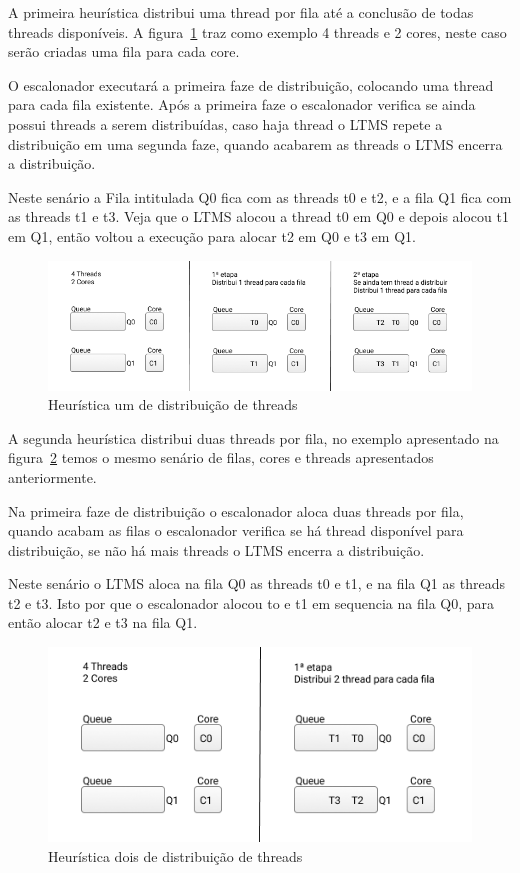 \documentclass[diss,capa]{texufpel}
\begin{document}
A primeira heurística distribui uma thread por fila até a conclusão de todas threads disponíveis. A figura~\ref{queue_one} traz como exemplo 4 threads e 2 cores, neste caso serão criadas uma fila para cada core.

O escalonador executará a primeira faze de distribuição, colocando uma thread para cada fila existente. Após a primeira faze o escalonador verifica se ainda possui threads a serem distribuídas, caso haja thread o LTMS repete a distribuição em uma segunda faze, quando acabarem as threads o LTMS encerra a distribuição.

Neste senário a Fila intitulada Q0 fica com as threads t0 e t2, e a fila Q1 fica com as threads t1 e t3. Veja que o LTMS alocou a thread t0 em Q0 e depois alocou t1 em Q1, então voltou a execução para alocar t2 em Q0 e t3 em Q1.

\begin{figure}[htbp]
  \centering
  \includegraphics[scale=.6]{images/Queue_one.png}
\caption{Heurística um de distribuição de threads}
\label{queue_one}
\end{figure}

A segunda heurística distribui duas threads por fila, no exemplo apresentado na figura~\ref{queue_two} temos o mesmo senário de filas, cores e threads apresentados anteriormente.

Na primeira faze de distribuição o escalonador aloca duas threads por fila, quando acabam as filas o escalonador verifica se há thread disponível para distribuição, se não há mais threads o LTMS encerra a distribuição.

Neste senário o LTMS aloca na fila Q0 as threads t0 e t1, e na fila Q1 as threads t2 e t3. Isto por que o escalonador alocou to e t1 em sequencia na fila Q0, para então alocar t2 e t3 na fila Q1.

\begin{figure}[htbp]
  \centering
  \includegraphics[scale=.8]{images/Queue_two.png}
\caption{Heurística dois de distribuição de threads}
\label{queue_two}
\end{figure}
\end{document}

